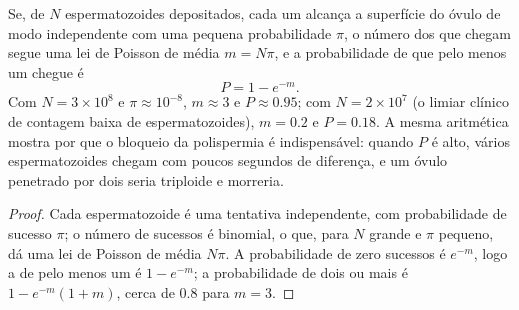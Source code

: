 \begin{theorem}\label{thm:b2:mammal-reproduction:poisson}
Se, de $N$ espermatozoides depositados, cada um alcança a superfície
do óvulo de modo independente com uma pequena probabilidade $\pi$, o
número dos que chegam segue uma lei de Poisson de média $m = N\pi$, e a
probabilidade de que pelo menos um chegue é
\[
P = 1 - e^{-m}.
\]
Com $N = 3\times 10^{8}$ e $\pi \approx 10^{-8}$, $m \approx 3$
e $P \approx 0.95$; com $N = 2\times 10^{7}$ (o limiar clínico de
contagem baixa de espermatozoides), $m = 0.2$ e $P = 0.18$. A mesma
aritmética mostra por que o bloqueio da polispermia é indispensável:
quando $P$ é alto, vários espermatozoides chegam com poucos segundos de
diferença, e um óvulo penetrado por dois seria triploide e morreria.
\end{theorem}
\begin{proof}
Cada espermatozoide é uma tentativa independente, com probabilidade de
sucesso $\pi$; o número de sucessos é binomial, o que, para $N$ grande
e $\pi$ pequeno, dá uma lei de Poisson de média $N\pi$. A probabilidade
de zero sucessos é $e^{-m}$, logo a de pelo menos um é $1 - e^{-m}$; a
probabilidade de dois ou mais é $1 - e^{-m}(1 + m)$, cerca de $0.8$
para $m = 3$.
\end{proof}

